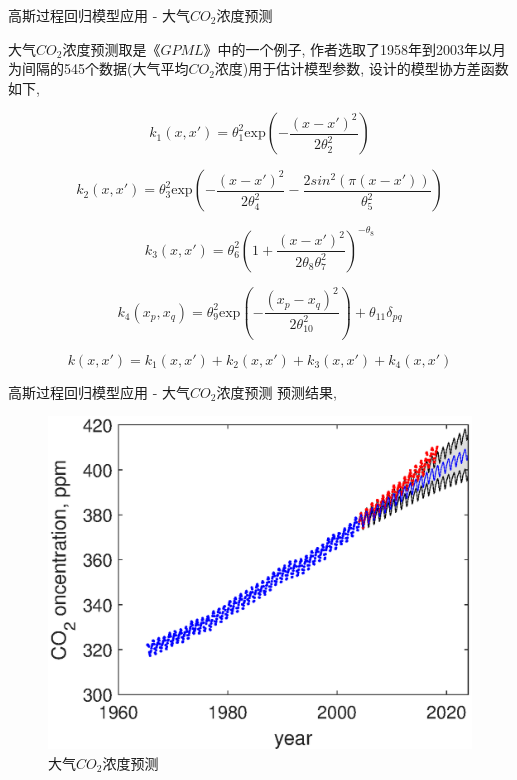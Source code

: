 \begin{frame}{高斯过程回归模型应用 - 大气$CO_{2}$浓度预测}

    大气$CO_{2}$浓度预测取是《$GPML$》中的一个例子, 作者选取了1958年到2003年以月为间隔的545个数据(大气平均$CO_{2}$浓度)用于估计模型参数, 设计的模型协方差函数如下, 

    $$k_{1}(x,x')=\theta^{2}_{1}\mathrm{exp}\left(-\frac{(x-x')^{2}}{2\theta^{2}_{2}}\right)$$

    $$k_{2}(x,x')=\theta^{2}_{3}\mathrm{exp}\left(-\frac{(x-x')^{2}}{2\theta^{2}_{4}}-\frac{2sin^{2}(\pi(x-x'))}{\theta^{2}_{5}}\right)$$

    $$k_{3}(x,x')=\theta^{2}_{6}\left(1+\frac{(x-x')^{2}}{2\theta_{8}\theta^{2}_{7}}\right)^{-\theta_{8}}$$

    $$k_{4}(x_{p},x_{q})=\theta^{2}_{9}\mathrm{exp}\left(-\frac{(x_{p}-x_{q})^{2}}{2\theta^{2}_{10}}\right)+\theta_{11}\delta_{pq}$$

    $$k(x,x')=k_{1}(x,x')+k_{2}(x,x')+k_{3}(x,x')+k_{4}(x,x')$$

\end{frame}

\begin{frame}{高斯过程回归模型应用 - 大气$CO_{2}$浓度预测}
    预测结果,
    \vspace{-1ex}
    \begin{figure}[H]
        \centering
        \includegraphics[scale=0.5]{./fig/co2.eps} 
        \caption{$大气CO_{2}$浓度预测}
    \end{figure}
\end{frame}

